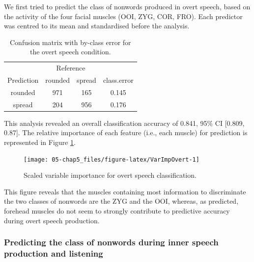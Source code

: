 \documentclass[a4paper,12pt,twoside,openright,oldfontcommands,final]{memoir}
\begin{document}
We first tried to predict the class of nonwords produced in overt speech, based on the activity of the four facial muscles (OOI, ZYG, COR, FRO). Each predictor was centred to its mean and standardised before the analysis.

\begin{table}[H]
\begin{center}
\begin{threeparttable}
\caption{\label{tab:CMovert}Confusion matrix with by-class error for the overt speech condition.}
\begin{tabular}{cccc}
\toprule
 & \multicolumn{2}{c}{Reference}  &\\
\cmidrule(r){2-3}
Prediction & \multicolumn{1}{c}{rounded} & \multicolumn{1}{c}{spread} & \multicolumn{1}{c}{class.error}\\
\midrule
rounded & 971 & 165 & 0.145\\
spread & 204 & 956 & 0.176\\
\bottomrule
\end{tabular}
\end{threeparttable}
\end{center}
\end{table}

This analysis revealed an overall classification accuracy of 0.841, 95\% CI {[}0.809, 0.87{]}. The relative importance of each feature (i.e., each muscle) for prediction is represented in Figure \ref{fig:VarImpOvert}.

\begin{figure}[H]

{\centering \texttt{[image: 05-chap5\_files/figure-latex/VarImpOvert-1]} 

}

\caption{Scaled variable importance for overt speech classification.}\label{fig:VarImpOvert}
\end{figure}

This figure reveals that the muscles containing most information to discriminate the two classes of nonwords are the ZYG and the OOI, whereas, as predicted, forehead muscles do not seem to strongly contribute to predictive accuracy during overt speech production.

\hypertarget{predicting-the-class-of-nonwords-during-inner-speech-production-and-listening}{%
\subsubsection{Predicting the class of nonwords during inner speech production and listening}\label{predicting-the-class-of-nonwords-during-inner-speech-production-and-listening}}
\end{document}
